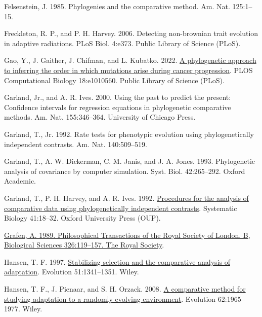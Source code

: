 \documentclass[fleqn,10pt,lineno]{wlpeerj} %
\newlength{\cslhangindent}
\newenvironment{CSLReferences}[2] %
 {\begin{list}{}{%
  \setlength{\itemindent}{0pt}
  \setlength{\leftmargin}{0pt}
  \setlength{\parsep}{0pt}
  \ifodd #1
   \setlength{\leftmargin}{\cslhangindent}
   \setlength{\itemindent}{-1\cslhangindent}
  \fi
  \setlength{\itemsep}{#2\baselineskip}}}
 {\end{list}}
\begin{document}
\begin{CSLReferences}{1}{0}
Felsenstein, J. 1985. Phylogenies and the comparative method. Am. Nat. 125:1--15.

Freckleton, R. P., and P. H. Harvey. 2006. Detecting non-brownian trait evolution in adaptive radiations. PLoS Biol. 4:e373. Public Library of Science (PLoS).

Gao, Y., J. Gaither, J. Chifman, and L. Kubatko. 2022. \href{https://doi.org/10.1371/journal.pcbi.1010560}{A phylogenetic approach to inferring the order in which mutations arise during cancer progression}. PLOS Computational Biology 18:e1010560. Public Library of Science (PLoS).

Garland, Jr., and A. R. Ives. 2000. Using the past to predict the present: Confidence intervals for regression equations in phylogenetic comparative methods. Am. Nat. 155:346--364. University of Chicago Press.

Garland, T., Jr. 1992. Rate tests for phenotypic evolution using phylogenetically independent contrasts. Am. Nat. 140:509--519.

Garland, T., A. W. Dickerman, C. M. Janis, and J. A. Jones. 1993. Phylogenetic analysis of covariance by computer simulation. Syst. Biol. 42:265--292. Oxford Academic.

Garland, T., P. H. Harvey, and A. R. Ives. 1992. \href{https://doi.org/10.1093/sysbio/41.1.18}{Procedures for the analysis of comparative data using phylogenetically independent contrasts}. Systematic Biology 41:18--32. Oxford University Press (OUP).

\href{https://doi.org/10.1098/rstb.1989.0106}{Grafen, A. 1989. Philosophical Transactions of the Royal Society of London. B, Biological Sciences 326:119--157. The Royal Society}.

Hansen, T. F. 1997. \href{https://doi.org/10.1111/j.1558-5646.1997.tb01457.x}{Stabilizing selection and the comparative analysis of adaptation}. Evolution 51:1341--1351. Wiley.

Hansen, T. F., J. Pienaar, and S. H. Orzack. 2008. \href{https://doi.org/10.1111/j.1558-5646.2008.00412.x}{A comparative method for studying adaptation to a randomly evolving environment}. Evolution 62:1965--1977. Wiley.


\end{CSLReferences}
\end{document}
